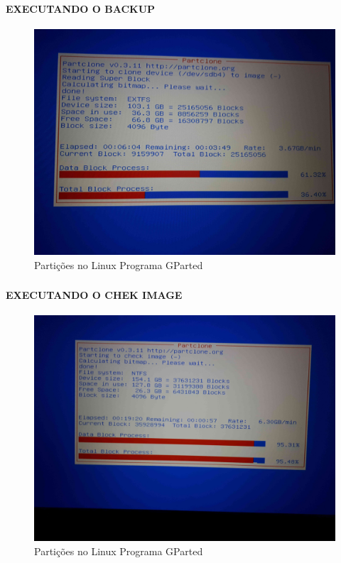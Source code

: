 \documentclass{beamer}
\begin{document}
\begin{frame}[plain,c]
   \frametitle{\insertsection}
    \framesubtitle{EXECUTANDO O BACKUP}
    \begin{figure}[!h]
        \includegraphics[width=1\linewidth]{images/backup/bkp28.jpg}
        \caption{Partições no Linux Programa GParted}
    \end{figure}
\end{frame}	


\begin{frame}[plain,c]
   \frametitle{\insertsection}
    \framesubtitle{EXECUTANDO O CHEK IMAGE}
    \begin{figure}[!h]
        \includegraphics[width=1\linewidth]{images/backup/bkp29.jpg}
        \caption{Partições no Linux Programa GParted}
    \end{figure}
\end{frame}	
\end{document}
